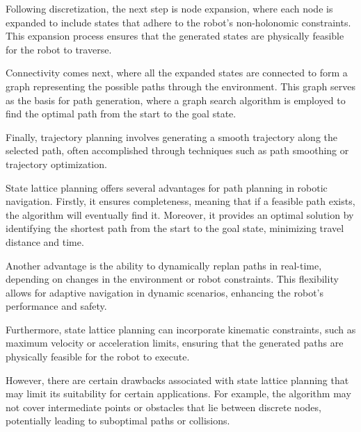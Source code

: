 \vspace*{6mm}

Following discretization, the next step is node expansion, where each node is expanded to include states that adhere to the robot's non-holonomic constraints. This expansion process ensures that the generated states are physically feasible for the robot to traverse.

\vspace*{6mm}

Connectivity comes next, where all the expanded states are connected to form a graph representing the possible paths through the environment. This graph serves as the basis for path generation, where a graph search algorithm is employed to find the optimal path from the start to the goal state.

\vspace*{6mm}

Finally, trajectory planning involves generating a smooth trajectory along the selected path, often accomplished through techniques such as path smoothing or trajectory optimization.

\vspace*{6mm}

State lattice planning offers several advantages for path planning in robotic navigation. Firstly, it ensures completeness, meaning that if a feasible path exists, the algorithm will eventually find it. Moreover, it provides an optimal solution by identifying the shortest path from the start to the goal state, minimizing travel distance and time.

\vspace*{6mm}

Another advantage is the ability to dynamically replan paths in real-time, depending on changes in the environment or robot constraints. This flexibility allows for adaptive navigation in dynamic scenarios, enhancing the robot's performance and safety.

\vspace*{6mm}

Furthermore, state lattice planning can incorporate kinematic constraints, such as maximum velocity or acceleration limits, ensuring that the generated paths are physically feasible for the robot to execute.

\vspace*{6mm}

However, there are certain drawbacks associated with state lattice planning that may limit its suitability for certain applications. For example, the algorithm may not cover intermediate points or obstacles that lie between discrete nodes, potentially leading to suboptimal paths or collisions.

